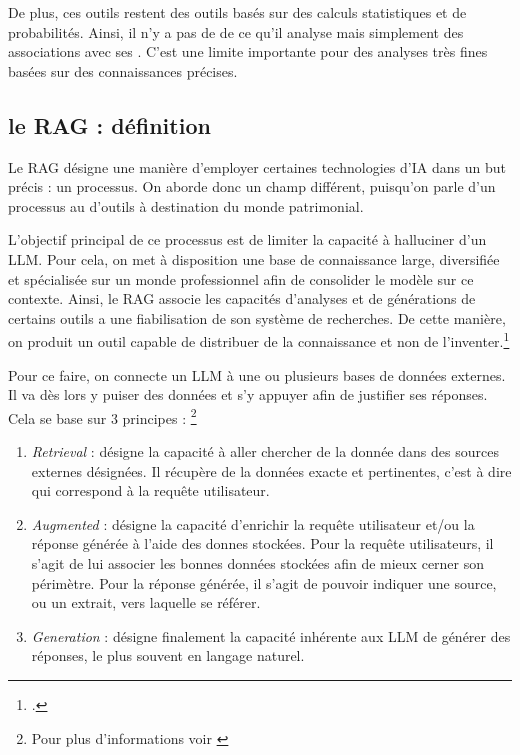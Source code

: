 De plus, ces outils restent des outils basés sur des calculs statistiques et de probabilités. Ainsi, il n'y a pas de  de ce qu'il analyse mais simplement des associations avec ses . C'est une limite importante pour des analyses très fines basées sur des connaissances précises. 


\subsection{le \gls{RAG} : définition}

\label{rag}

Le \gls{RAG} désigne une manière d'employer certaines technologies d'\gls{IA} dans un but précis : un processus. On aborde donc un champ différent, puisqu'on parle d'un processus au \coeur d'outils à destination du monde patrimonial.

L'objectif principal de ce processus est de limiter la capacité à halluciner d'un \gls{LLM}. Pour cela, on met à disposition une base de connaissance large, diversifiée et spécialisée sur un monde professionnel afin de consolider le modèle sur ce contexte. Ainsi, le \gls{RAG} associe les capacités d'analyses et de générations de certains outils a une fiabilisation de son système de recherches. De cette manière, on produit un outil capable de distribuer de la connaissance et non de l'inventer.\footcite{belcicQuestceQueGeneration2025}

Pour ce faire, on connecte un \gls{LLM} à une ou plusieurs bases de données externes. Il va dès lors y puiser des données et s'y appuyer afin de justifier ses réponses. Cela se base sur 3 principes : \footnote{Pour plus d'informations voir \cite{gaoRetrievalAugmentedGenerationLarge2024}}

\begin{enumerate}
	\item \textit{Retrieval} : désigne la capacité à aller chercher de la donnée dans des sources externes désignées. Il récupère de la données exacte et pertinentes, c'est à dire qui correspond à la requête utilisateur.
	
	\item \textit{Augmented} : désigne la capacité d'enrichir la requête utilisateur et/ou la réponse générée à l'aide des donnes stockées. Pour la requête utilisateurs, il s'agit de lui associer les bonnes données stockées afin de mieux cerner son périmètre. Pour la réponse générée, il s'agit de pouvoir indiquer une source, ou un extrait, vers laquelle se référer.
	
	\item \textit{Generation} : désigne finalement la capacité inhérente aux \gls{LLM} de générer des réponses, le plus souvent en langage naturel. 
\end{enumerate}

